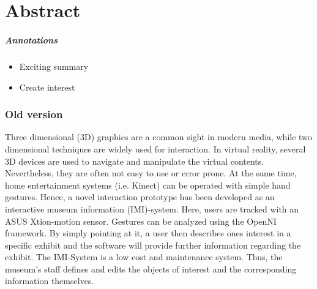 \chapter{Abstract}
\label{abstract}

\paragraph{Annotations}

\begin{itemize}
	\item Exciting summary
	\item Create interest 
\end{itemize}



\subsection*{Old version}

Three dimensional (3D) graphics are a common sight in modern media, while two dimensional techniques are widely used for interaction. In virtual reality, several 3D devices are used to navigate and manipulate the virtual contents. Nevertheless, they are often not easy to use or error prone. At the same time, home entertainment systems (i.e. Kinect) can be operated with simple hand gestures. Hence, a novel interaction prototype has been developed as an interactive museum information (IMI)-system. Here, users are tracked with an ASUS Xtion-motion sensor. Gestures can be analyzed using the OpenNI framework. By simply pointing at it, a user then describes ones interest in a specific exhibit and the software will provide further information regarding the exhibit. The IMI-System is a low cost and maintenance system. Thus, the museum's staff defines and edits the objects of interest and the corresponding information themselves.
